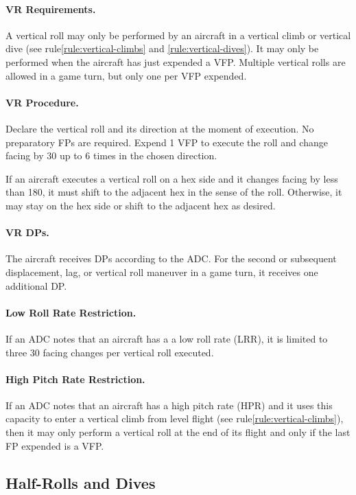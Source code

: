 {\paragraph{VR Requirements.} A vertical roll may only be performed by an aircraft in a vertical climb or vertical dive (see rule\ref{rule:vertical-climbs} and \ref{rule:vertical-dives}). It may only be performed when the aircraft has just expended a VFP. Multiple vertical rolls are allowed in a game turn, but only one per VFP expended.

\paragraph{VR Procedure.} Declare the vertical roll and its direction at the moment of execution. No preparatory FPs are required. Expend 1 VFP to execute the roll and change facing by 30{\deg} up to 6 times in the chosen direction. 

If an aircraft executes a vertical roll on a hex side and it changes facing by less than 180{\deg}, it must shift to the adjacent hex in the sense of the roll. Otherwise, it may stay on the hex side or shift to the adjacent hex as desired.

\paragraph{VR DPs.} The aircraft receives DPs according to the ADC. For the second or subsequent displacement, lag, or vertical roll maneuver in a game turn, it receives one additional DP.

\paragraph{Low Roll Rate Restriction.} If an ADC notes that an aircraft has a
a low roll rate (LRR), it is limited to three 30{\deg} facing changes per vertical roll executed.

\paragraph{High Pitch Rate Restriction.} If an ADC notes that an aircraft has a high pitch rate (HPR) and it uses this capacity to enter a vertical climb from level flight (see rule\ref{rule:vertical-climbs}), then it may only perform a vertical roll at the end of its flight and only if the last FP expended is a VFP.
}
\subsection{Half-Rolls and Dives}
\label{rule:half-rolls-and-dives}


